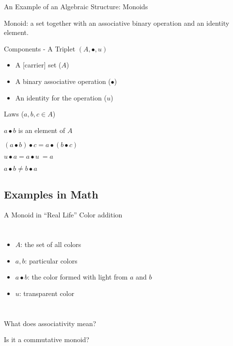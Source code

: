 \documentclass{beamer}
\begin{document}
\begin{frame}{An Example of an Algebraic Structure: Monoids}
  \begin{block}{}
    \alert{Monoid:} a set together with an associative binary operation
      and an identity element.
  \end{block}

  \pause

  \begin{block}{Components - A Triplet \((A, \bullet, u)\)}
  \begin{itemize}
    \item A [carrier] set (\(A\))
    \item A binary associative operation (\(\bullet\))
    \item An identity for the operation (\(u\))
  \end{itemize}
  \end{block}

  \pause
  \begin{block}{Laws (\(a,b,c \in A\))}

  \begin{description}[Commutativity:]
    \item[Closure:] \(a \bullet b\) is an element of \(A\)
    \item[Associativity:] \((a \bullet b) \bullet c = a \bullet (b \bullet c)\)
    \item[Identity:] \(u \bullet a = a \bullet u \ = a\)
    \item[\sout{Commutativity:}] \(a \bullet b \neq b \bullet a\)
  \end{description}
  \end{block}
\end{frame}


\subsection{Examples in Math}
\begin{frame}{A Monoid in ``Real Life''}
  \alert{Color addition}
  \begin{columns}[c]
      \begin{itemize}
        \item \(A\): the set of all colors
        \item \(a, b\): particular colors
        \item \(a \bullet b\): the color formed with light from \(a\) and \(b\)
        \item \(u\): transparent color
      \end{itemize}


    \begin{figure}
        \centering
        \def\svgwidth{\columnwidth}
        
    \end{figure}
  \end{columns}

  \alert{What does associativity mean?}

  \alert{Is it a commutative monoid?}
\end{frame}
\end{document}

